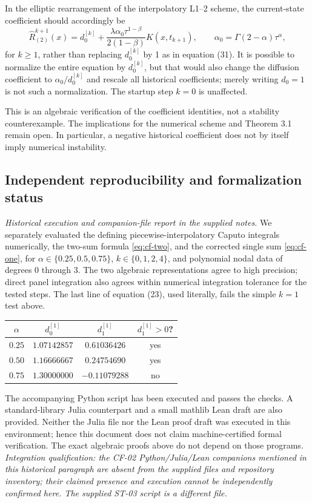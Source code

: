 \documentclass[11pt]{amsart}
\numberwithin{equation}{section}
\theoremstyle{remark}
\begin{document}
In the elliptic rearrangement of the interpolatory L1--2 scheme, the
current-state coefficient should accordingly be
\[
\widehat R_{(2)}^{k+1}(x)=d_0^{[k]}
+\frac{\lambda\alpha_0\tau^{1-\beta}}{2(1-\beta)}K(x,t_{k+1}),
\qquad \alpha_0=\Gamma(2-\alpha)\tau^\alpha,
\]
for $k\geq1$, rather than replacing $d_0^{[k]}$ by 1 as in equation (31).
It is possible to normalize the entire equation by $d_0^{[k]}$, but that
would also change the diffusion coefficient to $\alpha_0/d_0^{[k]}$ and
rescale all historical coefficients; merely writing $d_0=1$ is not such a
normalization. The startup step $k=0$ is unaffected.

This is an algebraic verification of the coefficient identities, not a
stability counterexample. The implications for the numerical scheme and
Theorem 3.1 remain open. In particular, a negative historical coefficient
does not by itself imply numerical instability.

\subsection{Independent reproducibility and formalization status}
\textit{Historical execution and companion-file report in the supplied notes.}
We separately evaluated the defining piecewise-interpolatory Caputo integrals
numerically, the two-sum formula \eqref{eq:cf-two}, and the corrected single
sum \eqref{eq:cf-one}, for $\alpha\in\{0.25,0.5,0.75\}$,
$k\in\{0,1,2,4\}$, and polynomial nodal data of degrees 0 through 3.
The two algebraic representations agree to high precision; direct panel
integration also agrees within numerical integration tolerance for the
tested steps. The last line of equation (23), used literally, fails the
simple $k=1$ test above.
\begin{center}
\begin{tabular}{@{}cccc@{}}
\toprule
$\alpha$ & $d_0^{[1]}$ & $d_1^{[1]}$ & $d_1^{[1]}>0$?\\
\midrule
$0.25$ & $1.07142857$ & $0.61036426$ & yes\\
$0.50$ & $1.16666667$ & $0.24754690$ & yes\\
$0.75$ & $1.30000000$ & $-0.11079288$ & no\\
\bottomrule
\end{tabular}
\end{center}
The accompanying Python script has been executed and passes the checks.
A standard-library Julia counterpart and a small mathlib Lean draft are also
provided. Neither the Julia file nor the Lean proof draft was executed in
this environment; hence this document does not claim machine-certified
formal verification. The exact algebraic proofs above do not depend on those
programs.
\textit{Integration qualification: the CF-02 Python/Julia/Lean companions
mentioned in this historical paragraph are absent from the supplied files
and repository inventory; their claimed presence and execution cannot be
independently confirmed here. The supplied ST-03 script is a different file.}
\end{document}
